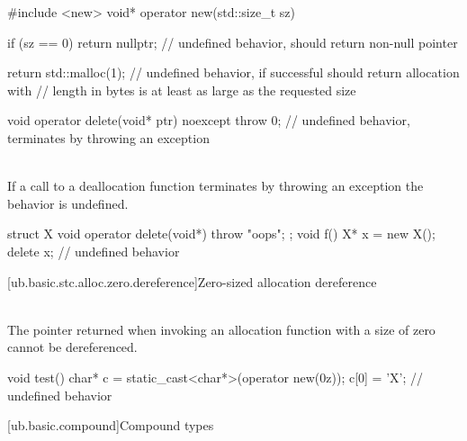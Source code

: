 \pnum
\begin{example}
\begin{codeblock}
#include <new>
void* operator new(std::size_t sz) {
  if (sz == 0)
    return nullptr;             // undefined behavior,  should return non-null pointer

  return std::malloc(1);        // undefined behavior, if successful should return allocation with
                                // length in bytes is at least as large as the requested size
}
void operator delete(void* ptr) noexcept {
  throw 0;                      // undefined behavior, terminates by throwing an exception
}
\end{codeblock}
\end{example}

\pnum
{} \\
If a call to a deallocation function
terminates by throwing an exception
the behavior is undefined.
\pnum
\begin{example}
\begin{codeblock}
struct X {
  void operator delete(void*) { throw "oops"; }
};
void f()
{
  X* x = new X();
  delete x;  // undefined behavior
}
\end{codeblock}
\end{example}



[ub.basic.stc.alloc.zero.dereference]{Zero-sized allocation dereference}

\pnum
{} \\
The pointer returned when invoking an allocation function with a size of zero
cannot be dereferenced.

\pnum
\begin{example}
\begin{codeblock}
void test()
{
    char* c = static_cast<char*>(operator new(0z));
    c[0] = 'X';     // undefined behavior
}
\end{codeblock}
\end{example}

[ub.basic.compound]{Compound types}

